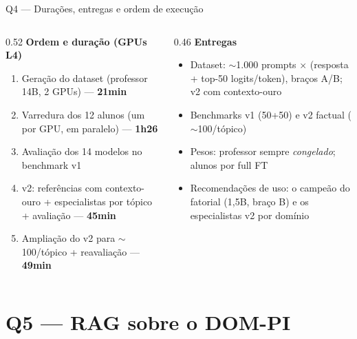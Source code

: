 \documentclass[10pt,aspectratio=169]{beamer}
\begin{document}
\begin{frame}{Q4 — Durações, entregas e ordem de execução}
  \begin{columns}[T]
    \begin{column}{0.52\textwidth}
      \textbf{Ordem e duração (GPUs L4)}
      \begin{enumerate}\small
        \item Geração do dataset (professor 14B, 2 GPUs) — \textbf{21min}
        \item Varredura dos 12 alunos (um por GPU, em paralelo) — \textbf{1h26}
        \item Avaliação dos 14 modelos no benchmark v1
        \item v2: referências com contexto-ouro + especialistas por tópico + avaliação — \textbf{45min}
        \item Ampliação do v2 para $\sim$100/tópico + reavaliação — \textbf{49min}
      \end{enumerate}
    \end{column}
    \begin{column}{0.46\textwidth}
      \textbf{Entregas}
      \begin{itemize}\small
        \item Dataset: $\sim$1.000 prompts $\times$ (resposta + top-50 logits/token), braços A/B; v2 com contexto-ouro
        \item Benchmarks v1 (50+50) e v2 factual ($\sim$100/tópico)
        \item Pesos: professor sempre \emph{congelado}; alunos por full FT
        \item Recomendações de uso: o campeão do fatorial (1,5B, braço B) e os especialistas v2 por domínio
      \end{itemize}
    \end{column}
  \end{columns}
\end{frame}

\section{Q5 — RAG sobre o DOM-PI}
\end{document}
